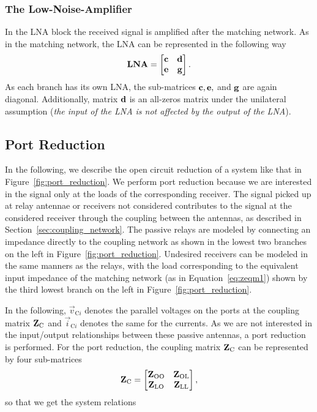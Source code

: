\subsubsection{The Low-Noise-Amplifier}
\label{sec:lna}
In the LNA block the received signal is amplified after the matching network.
As in the matching network, the LNA can be represented in the following way
\begin{equation}
\mathbf{LNA}=
\begin{bmatrix}
\mathbf{c} & \mathbf{d} \\
\mathbf{e} & \mathbf{g}
\end{bmatrix}.
\end{equation}
As each branch has its own LNA, the sub-matrices $\mathbf{c},\mathbf{e},$ and $\mathbf{g}$ are again diagonal.
Additionally, matrix $\mathbf{d}$ is an all-zeros matrix under the unilateral assumption (\textit{the input of the LNA is not affected by the output of the LNA}).




\subsection{Port Reduction}
\label{sec:port_reduction}

In the following, we describe the open circuit reduction of a system like that in Figure~\ref{fig:port_reduction}.
We perform port reduction because we are interested in the signal only at the loads of the corresponding receiver.
The signal picked up at relay antennae or receivers not considered contributes to the signal at the considered receiver through the coupling between the antennas, as described in Section~\ref{sec:coupling_network}.
The passive relays are modeled by connecting an impedance directly to the coupling network as shown in the lowest two branches on the left in Figure~\ref{fig:port_reduction}.
Undesired receivers can be modeled in the same manners as the relays, with the load corresponding to the equivalent input impedance of the matching network (as in Equation~\eqref{eq:zeqm1}) shown by the third lowest branch on the left in Figure~\ref{fig:port_reduction}.

In the following, $\vec{v}_{\text{C}i}$ denotes the parallel voltages on the ports at the coupling matrix $\mathbf{Z}_\text{C}$ and $\vec{i}_{\text{C}i}$ denotes the same for the currents.
As we are not interested in the input/output relationships between these passive antennas, a port reduction is performed.
For the port reduction, the coupling matrix $\mathbf{Z}_\text{C}$ can be represented by four sub-matrices
\begin{equation}
\mathbf{Z}_\text{C}=
\begin{bmatrix}
\mathbf{Z}_\text{OO} & \mathbf{Z}_\text{OL}\\
\mathbf{Z}_\text{LO} & \mathbf{Z}_\text{LL}
\end{bmatrix},
\end{equation}
so that we get the system relations

